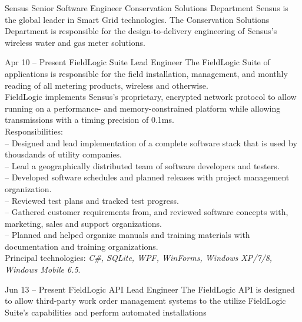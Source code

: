 \documentclass[a4paper, 10pt]{article}
\begin{document}
    \begin{resume}
        \begin{position} {Sensus} {Senior Software Engineer} {Conservation Solutions Department}
            Sensus is the global leader in Smart Grid technologies.  The Conservation Solutions
            Department is responsible for the design-to-delivery engineering of Sensus's wireless
            water and gas meter solutions.
        \end{position}
        \begin{project} {Apr 10 -- Present} {FieldLogic Suite} {Lead Engineer}
            The FieldLogic Suite of applications is responsible for the field installation,
            management, and monthly reading of all metering products, wireless and otherwise.
            \\[1ex]
            FieldLogic implements Sensus's proprietary, encrypted network protocol to allow running
            on a performance- and memory-constrained platform while allowing transmissions with a
            timing precision of 0.1ms.
            \\[1ex]
            Responsibilities: \\
            -- Designed and lead implementation of a complete software stack that is used by thousdands of utility companies. \\
            -- Lead a geographically distributed team of software developers and testers. \\
            -- Developed software schedules and planned releases with project management organization. \\
            -- Reviewed test plans and tracked test progress. \\
            -- Gathered customer requirements from, and reviewed software concepts with, marketing, sales and support organizations. \\
            -- Planned and helped organize manuals and training materials with documentation and training organizations.
            \\[1ex]
            Principal technologies: \emph{C\#, SQLite, WPF, WinForms, Windows XP/7/8, Windows Mobile 6.5}.
        \end{project}
        \begin{project} {Jun 13 -- Present} {FieldLogic API} {Lead Engineer}
            The FieldLogic API is designed to allow third-party work order management systems
            to the utilize FieldLogic Suite's capabilities and perform automated installations

\end{project}
\end{resume}
\end{document}
